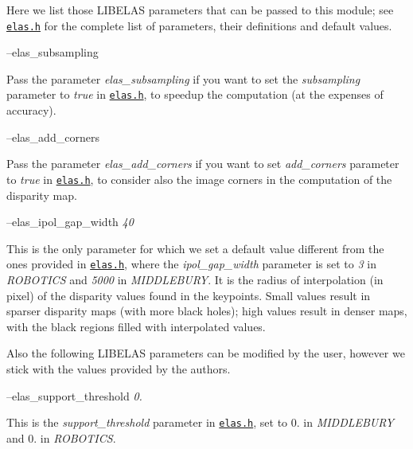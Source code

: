 Here we list those L\+I\+B\+E\+L\+AS parameters that can be passed to this module; see \href{https://github.com/robotology/stereo-vision/tree/master/lib/elas/include/elas.h}{\tt elas.\+h} for the complete list of parameters, their definitions and default values.

--elas\+\_\+subsampling
\begin{DoxyItemize}
\item Pass the parameter {\itshape elas\+\_\+subsampling} if you want to set the {\itshape subsampling} parameter to {\itshape true} in \href{https://github.com/robotology/stereo-vision/tree/master/lib/elas/include/elas.h}{\tt elas.\+h}, to speedup the computation (at the expenses of accuracy).
\end{DoxyItemize}

--elas\+\_\+add\+\_\+corners
\begin{DoxyItemize}
\item Pass the parameter {\itshape elas\+\_\+add\+\_\+corners} if you want to set {\itshape add\+\_\+corners} parameter to {\itshape true} in \href{https://github.com/robotology/stereo-vision/tree/master/lib/elas/include/elas.h}{\tt elas.\+h}, to consider also the image corners in the computation of the disparity map.
\end{DoxyItemize}

--elas\+\_\+ipol\+\_\+gap\+\_\+width {\itshape 40} 
\begin{DoxyItemize}
\item This is the only parameter for which we set a default value different from the ones provided in \href{https://github.com/robotology/stereo-vision/tree/master/lib/elas/include/elas.h}{\tt elas.\+h}, where the {\itshape ipol\+\_\+gap\+\_\+width} parameter is set to {\itshape 3} in {\itshape R\+O\+B\+O\+T\+I\+CS} and {\itshape 5000} in {\itshape M\+I\+D\+D\+L\+E\+B\+U\+RY}. It is the radius of interpolation (in pixel) of the disparity values found in the keypoints. Small values result in sparser disparity maps (with more black holes); high values result in denser maps, with the black regions filled with interpolated values.
\end{DoxyItemize}

Also the following L\+I\+B\+E\+L\+AS parameters can be modified by the user, however we stick with the values provided by the authors.

--elas\+\_\+support\+\_\+threshold {\itshape 0.} 
\begin{DoxyItemize}
\item This is the {\itshape support\+\_\+threshold} parameter in \href{https://github.com/robotology/stereo-vision/tree/master/lib/elas/include/elas.h}{\tt elas.\+h}, set to 0. in {\itshape M\+I\+D\+D\+L\+E\+B\+U\+RY} and 0. in {\itshape R\+O\+B\+O\+T\+I\+CS}.
\end{DoxyItemize}

